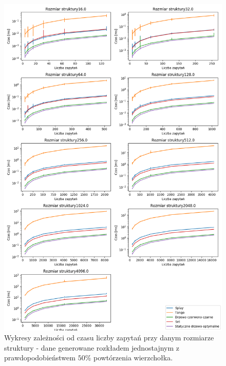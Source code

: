 \documentclass[declaration,shortabstract]{iithesis}
\theoremstyle{thm}
\theoremstyle{remark}
\theoremstyle{plain}
\theoremstyle{plain}
\theoremstyle{plain}
\begin{document}
\begin{figure}[H]  
\centering
    \includegraphics[scale=0.5]{wykresy/uniform50.png}
      \caption{Wykresy zależności od czasu liczby zapytań przy danym rozmiarze struktury - dane generowane rozkładem jednostajnym z prawdopodobieństwem  \(50\%\) powtórzenia wierzchołka. }  
    \label{fig:zigzig} 
\end{figure}
\end{document}
